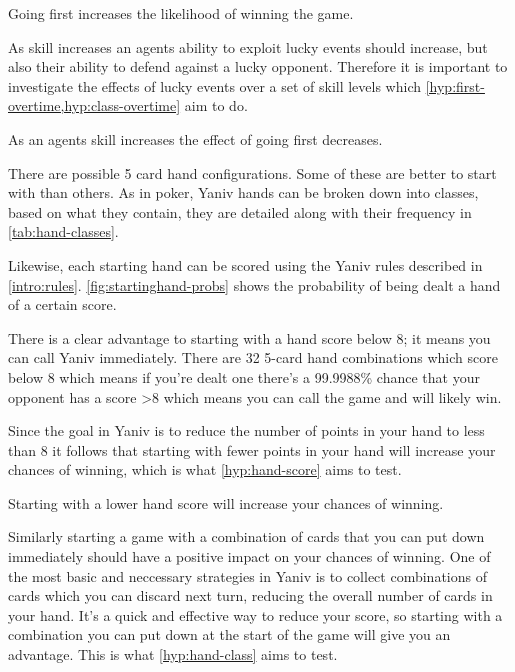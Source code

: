 \documentclass[../main.tex]{subfiles}
\begin{document}
\begin{hyp} \label{hyp:going-first}
Going first increases the likelihood of winning the game.
\end{hyp}

As skill increases an agents ability to exploit lucky events should increase, but also their ability to defend against a lucky opponent. Therefore it is important to investigate the effects of lucky events over a set of skill levels which \cref{hyp:first-overtime,hyp:class-overtime} aim to do. 

\begin{hyp} \label{hyp:first-overtime}
As an agents skill increases the effect of going first decreases. 
\end{hyp}

There are  possible 5 card hand configurations. Some of these are better to start with than others. As in poker, Yaniv hands can be broken down into classes, based on what they contain, they are detailed along with their frequency in \autoref{tab:hand-classes}. 

Likewise, each starting hand can be scored using the Yaniv rules described in \autoref{intro:rules}. \autoref{fig:startinghand-probs} shows the probability of being dealt a hand of a certain score.

There is a clear advantage to starting with a hand score below 8; it means you can call Yaniv immediately. There are 32 5-card hand combinations which score below 8 which means if you're dealt one there's a 99.9988\% chance that  your opponent has a score >8 which means you can call the game and will likely win. 

Since the goal in Yaniv is to reduce the number of points in your hand to less than 8 it follows that starting with fewer points in your hand will increase your chances of winning, which is what \cref{hyp:hand-score} aims to test.

\begin{hyp} \label{hyp:hand-score}
Starting with a lower hand score will increase your chances of winning. 
\end{hyp}

Similarly starting a game with a combination of cards that you can put down immediately should have a positive impact on your chances of winning. One of the most basic and neccessary strategies in Yaniv is to collect combinations of cards which you can discard next turn, reducing the overall number of cards in your hand. It's a quick and effective way to reduce your score, so starting with a combination you can put down at the start of the game will give you an advantage. This is what \cref{hyp:hand-class} aims to test. 
\end{document}
